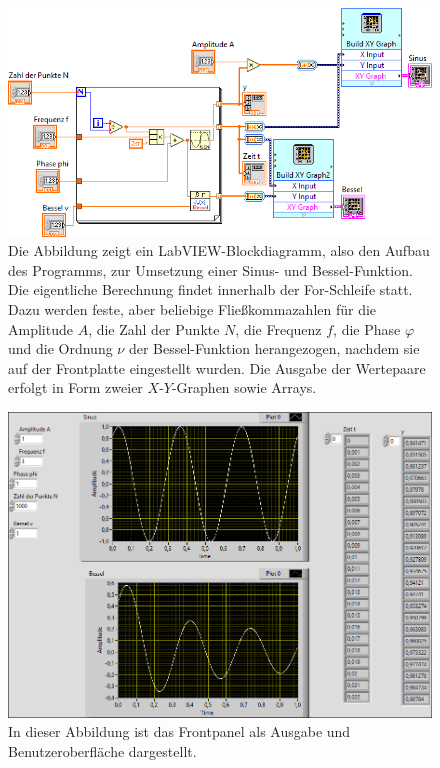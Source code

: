 \documentclass[
a4paper,
12pt,
pagesize,
ngerman
]{scrartcl}
\begin{document}
	\begin{figure}[H]
		\centering
		\includegraphics[width=1.0\textwidth]{EIRE2018Dateien/Tag1/sinusbessel-bilder/SinusBesseld}
		\caption{Die Abbildung zeigt ein LabVIEW-Blockdiagramm, also den Aufbau des Programms, zur Umsetzung einer Sinus- und Bessel-Funktion. Die eigentliche Berechnung findet innerhalb der For-Schleife statt. Dazu werden feste, aber beliebige Fließkommazahlen für die Amplitude $A$, die Zahl der Punkte $N$, die Frequenz $f$, die Phase $\varphi$ und die Ordnung $\nu$ der Bessel-Funktion herangezogen, nachdem sie auf der Frontplatte eingestellt wurden. Die Ausgabe der Wertepaare erfolgt in Form zweier $X$-$Y$-Graphen sowie Arrays.}
		\label{sinusbesselprogrammcode}
	\end{figure}

	\begin{figure}[H]
		\centering
		\includegraphics[width=1.0\textwidth]{EIRE2018Dateien/Tag1/sinusbessel-bilder/SinusBesselp}
		\caption{In dieser Abbildung ist das Frontpanel als Ausgabe und Benutzeroberfläche dargestellt.}
		\label{sinusbesselausgabe}
	\end{figure}
	
\end{document}
